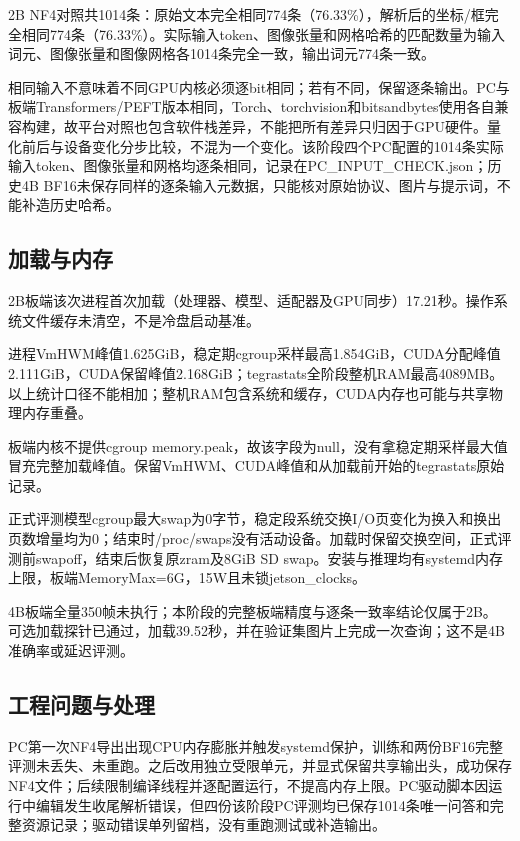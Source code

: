 2B NF4对照共1014条：原始文本完全相同774条（76.33\%），解析后的坐标/框完全相同774条（76.33\%）。实际输入token、图像张量和网格哈希的匹配数量为输入词元、图像张量和图像网格各1014条完全一致，输出词元774条一致。

相同输入不意味着不同GPU内核必须逐bit相同；若有不同，保留逐条输出。PC与板端Transformers/PEFT版本相同，Torch、torchvision和bitsandbytes使用各自兼容构建，故平台对照也包含软件栈差异，不能把所有差异只归因于GPU硬件。量化前后与设备变化分步比较，不混为一个变化。该阶段四个PC配置的1014条实际输入token、图像张量和网格均逐条相同，记录在PC\_INPUT\_CHECK.json；历史4B BF16未保存同样的逐条输入元数据，只能核对原始协议、图片与提示词，不能补造历史哈希。

\subsection{加载与内存}\label{s22-detail-5}

2B板端该次进程首次加载（处理器、模型、适配器及GPU同步）17.21秒。操作系统文件缓存未清空，不是冷盘启动基准。

进程VmHWM峰值1.625GiB，稳定期cgroup采样最高1.854GiB，CUDA分配峰值2.111GiB，CUDA保留峰值2.168GiB；tegrastats全阶段整机RAM最高4089MB。以上统计口径不能相加；整机RAM包含系统和缓存，CUDA内存也可能与共享物理内存重叠。

板端内核不提供cgroup memory.peak，故该字段为null，没有拿稳定期采样最大值冒充完整加载峰值。保留VmHWM、CUDA峰值和从加载前开始的tegrastats原始记录。

正式评测模型cgroup最大swap为0字节，稳定段系统交换I/O页变化为换入和换出页数增量均为0；结束时/proc/swaps没有活动设备。加载时保留交换空间，正式评测前swapoff，结束后恢复原zram及8GiB SD swap。安装与推理均有systemd内存上限，板端MemoryMax=6G，15W且未锁jetson\_clocks。

4B板端全量350帧未执行；本阶段的完整板端精度与逐条一致率结论仅属于2B。 可选加载探针已通过，加载39.52秒，并在验证集图片上完成一次查询；这不是4B准确率或延迟评测。

\subsection{工程问题与处理}\label{s22-detail-6}

PC第一次NF4导出出现CPU内存膨胀并触发systemd保护，训练和两份BF16完整评测未丢失、未重跑。之后改用独立受限单元，并显式保留共享输出头，成功保存NF4文件；后续限制编译线程并逐配置运行，不提高内存上限。PC驱动脚本因运行中编辑发生收尾解析错误，但四份该阶段PC评测均已保存1014条唯一问答和完整资源记录；驱动错误单列留档，没有重跑测试或补造输出。

